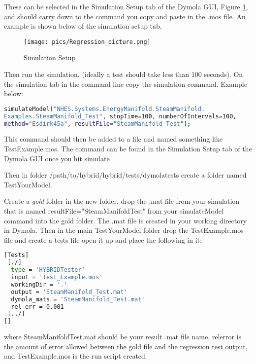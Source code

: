 These can be selected in the Simulation Setup tab of the Dymola GUI, Figure \ref{Interval Setup}, and should carry down to the command you copy and paste in the .mos file. An example is shown below of the simulation setup tab.

\begin{figure}[hbtp]
\centering
\texttt{[image: pics/Regression\_picture.png]}
\caption{Simulation Setup}
\label{Interval Setup}
\end{figure}

Then run the simulation, (ideally a test should take less than 100 seconds). On the simulation tab in the command line copy the simulation command. Example below:

\begin{lstlisting}[language=bash, basicstyle=\small]
simulateModel("NHES.Systems.EnergyManifold.SteamManifold.
Examples.SteamManifold_Test", stopTime=100, numberOfIntervals=100,
method="Esdirk45a", resultFile="SteamManifold_Test");
\end{lstlisting}

This command should then be added to a file and named something like Test\textunderscore Example.mos. The command can be found in the Simulation Setup tab of the Dymola GUI once you hit simulate

Then in folder /path/to/hybrid/hybrid/tests/dymola\textunderscore tests create a folder named Test\textunderscore YourModel.

Create a \textit{gold} folder in the new folder, drop the .mat file from your simulation that is named resultFile="SteamManifold\textunderscore Test" from your simulateModel command into the gold folder. The .mat file is created in your working directory in Dymola. Then in the main Test\textunderscore YourModel folder drop the Test\textunderscore Example.mos file and create a tests file open it up and place the following in it:


\begin{lstlisting}[language=bash, basicstyle=\small]
[Tests]
 [./]
  type = 'HYBRIDTester'
  input = 'Test_Example.mos'
  workingDir = '.'
  output = 'SteamManifold_Test.mat'
  dymola_mats = 'SteamManifold_Test.mat'  
  rel_err = 0.001
 [../]
[]
\end{lstlisting}

where SteamManifold\textunderscore Test.mat should be your result .mat file name, rel\textunderscore error is the amount of error allowed between the gold file and the regression test output, and Test\textunderscore Example.mos is the run script created.

